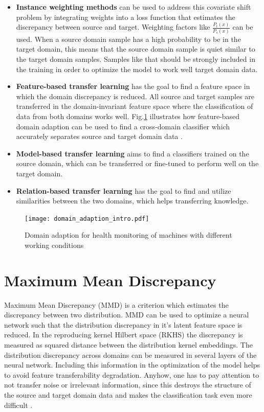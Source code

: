 \begin{itemize}
\item \textbf{Instance weighting methods} can be used to address this covariate shift problem by integrating weights into a loss function that estimates the discrepancy between source and target. Weighting factors like $\frac{P_{t}(x)}{P_{s}(x)}$ can be used. When a source domain sample has a high probability to be in the target domain, this means that the source domain sample is quiet similar to the target domain samples. Samples like that should be strongly included in the training in order to optimize the model to work well target domain data.
\item \textbf{Feature-based transfer learning} has the goal to find a feature space in which the domain discrepancy is reduced. All source and target samples are transferred in the domain-invariant feature space where the classification of data from both domains works well. Fig.\ref{fig:Domain_adaption_intro} illustrates how feature-based domain adaption can be used to find a cross-domain classifier which accurately separates source and target domain data \cite{Pandhare2021}. 
\item \textbf{Model-based transfer learning} aims to find a classifiers trained on the source domain, which can be transferred or fine-tuned to perform well on the target domain.
\item \textbf{Relation-based transfer learning} has the goal to find and utilize similarities between the two domains, which helps transferring knowledge. 
\end{itemize}

\begin{figure}[htpb]
  \centering
  \texttt{[image: domain\_adaption\_intro.pdf]}
  \caption {Domain adaption for health monitoring of machines with different working conditions \cite{Pandhare2021}} \label{fig:Domain_adaption_intro}
\end{figure}
\FloatBarrier 

\section{Maximum Mean Discrepancy}
Maximum Mean Discrepancy (MMD) is a criterion which estimates the discrepancy between two distribution. MMD can be used to optimize a neural network such that the distribution discrepancy in it's latent feature space is reduced. In the reproducing kernel Hilbert space (RKHS) the discrepancy is measured as squared distance between the distribution kernel embeddings. The distribution discrepancy across domains can be measured in several layers of the neural network. Including this information in the optimization of the model helps to avoid feature transferability degradation. Anyhow, one has to pay attention to not transfer noise or irrelevant information, since this destroys the structure of the source and target domain data and makes the classification task even more difficult \cite{li2020}. 

